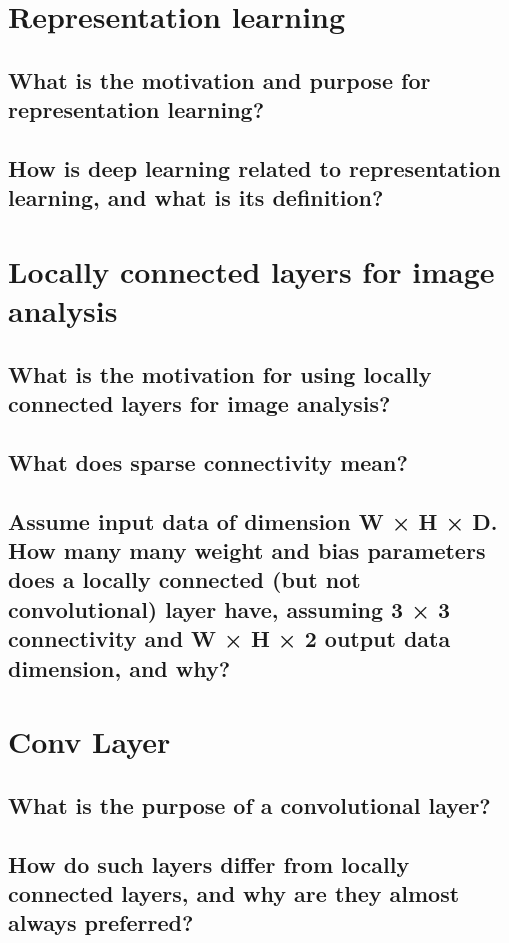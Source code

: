 \section{Representation learning}

\subsection{What is the motivation and purpose for representation learning?}

\subsection{How is deep learning related to representation learning, and what is its definition?}

\section{Locally connected layers for image analysis}

\subsection{What is the motivation for using locally connected layers for image analysis?}

\subsection{What does sparse connectivity mean?}

\subsection{Assume input data of dimension W × H × D. How many many weight and bias parameters does a locally connected (but not convolutional) layer have, assuming 3 × 3 connectivity and W × H × 2 output data dimension, and why?}

\section{Conv Layer}

\subsection{What is the purpose of a convolutional layer?}

\subsection{How do such layers differ from locally connected layers, and why are they almost always preferred?}

